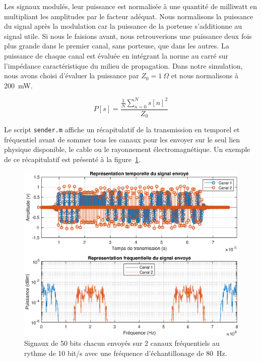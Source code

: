 \documentclass[10pt, oneside, a4paper]{article}
\begin{document}
Les signaux modulés, leur puissance est normalisée à une quantité de milliwatt en multipliant les amplitudes par le facteur adéquat.
Nous normalisons la puissance du signal après la modulation car la puissance de la porteuse s'additionne au signal utile.
Si nous le faisions avant, nous retrouverions une puissance deux fois plus grande dans le premier canal, sans porteuse, que dans les autres.
La puissance de chaque canal est évaluée en intégrant la norme au carré sur l'impédance caractéristique du milieu de propagation.
Dans notre simulation, nous avons choisi d'évaluer la puissance par $Z_0 = \SI{1}{\Omega}$ et nous normalisons à \SI{200}{\milli\watt}.

\begin{equation}
    P[s] = \frac{\frac{1}{N} \sum_{n = 0}^{N} s[n]^2}{Z_0}
\end{equation}

Le script \texttt{sender.m} affiche un récapitulatif de la transmission en temporel et fréquentiel avant de sommer tous les canaux pour les envoyer sur le seul lien physique disponible, le cable ou le rayonnement électromagnétique.
Un exemple de ce récapitulatif est présenté à la figure~\ref{fig:sender}.

\begin{figure}[p]
    \centering
    \includegraphics[height=0.4\textheight]{eps/sender.eps}
    \caption{Signaux de 50 bits chacun envoyés sur 2 canaux fréquentiels au rythme de 10 bit/s
             avec une fréquence d'échantillonage de \SI{80}{\hertz}.}
    \label{fig:sender}
\end{figure}
\end{document}
